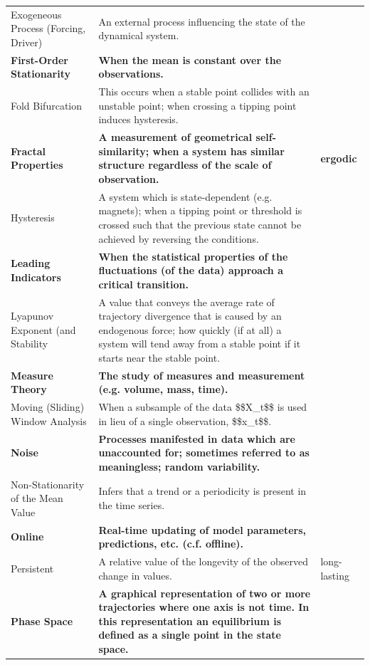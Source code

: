 \documentclass[print]{nuthesis}
\begin{document}
\begin{landscape}
\begin{longtable}{>{\raggedright\arraybackslash}p{12em}>{\raggedright\arraybackslash}p{35em}>{\raggedright\arraybackslash}p{8em}}
Exogeneous Process (Forcing, Driver) & An external process influencing the state of the dynamical system. & \\
\textbf{First-Order Stationarity} & \textbf{When the mean is constant over the observations.} & \textbf{}\\
\addlinespace
Fold Bifurcation & This occurs when a stable point collides with an unstable point; when crossing a tipping point induces hysteresis. & \\
\textbf{Fractal Properties} & \textbf{A measurement of geometrical self-similarity; when a system has similar structure regardless of the scale of observation.} & \textbf{ergodic}\\
Hysteresis & A system which is state-dependent (e.g. magnets); when a tipping point or threshold is crossed such that the previous state cannot be achieved by reversing the conditions. & \\
\textbf{Leading Indicators} & \textbf{When the statistical properties of the fluctuations (of the data) approach a critical transition.} & \textbf{}\\
Lyapunov Exponent (and Stability & A value that conveys the average rate of trajectory divergence that is caused by an endogenous force; how quickly (if at all) a system will tend away from a stable point if it starts near the stable point. & \\
\addlinespace
\textbf{Measure Theory} & \textbf{The study of measures and measurement (e.g. volume, mass, time).} & \textbf{}\\
Moving (Sliding) Window Analysis & When a subsample of the data \$\$X\_t\$\$ is used in lieu of a single observation, \$\$x\_t\$\$. & \\
\textbf{Noise} & \textbf{Processes manifested in data which are unaccounted for; sometimes referred to as meaningless; random variability.} & \textbf{}\\
Non-Stationarity of the Mean Value & Infers that a trend or a periodicity is present in the time series. & \\
\textbf{Online} & \textbf{Real-time updating of model parameters, predictions, etc. (c.f. offline).} & \textbf{}\\
\addlinespace
Persistent & A relative value of the longevity of the observed change in values. & long-lasting\\
\textbf{Phase Space} & \textbf{A graphical representation of two or more trajectories where one axis is not time. In this representation an equilibrium is defined as a single point in the state space.} & \textbf{}\\

\end{longtable}
\end{landscape}
\end{document}
